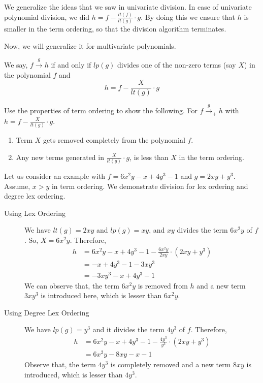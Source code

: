 We generalize the ideas that we saw in univariate division.  In case of
univariate polynomial division, we did $ h = f - \frac{lt(f)}{lt(g)}\cdot g$.
By doing this we ensure that $h$ is smaller in the term ordering, so that the
division algorithm terminates.

Now, we will generalize it for  multivariate polynomials.

\begin{definition}
We say, $f \stackrel{g}{\longrightarrow} h$ if and only if $lp(g)$ divides
one of the non-zero terms (say $X$) in the polynomial $f$ and 
$$ h = f - \frac{X}{lt(g)}\cdot g$$
\end{definition}

\begin{exercise} 
	Use the properties of term ordering to show the following. For  $f
	\stackrel{g}{\longrightarrow}_{+} h$ with $h = f -
	\frac{X}{lt(g)}\cdot g$.
	\begin{enumerate}
		\item Term $X$ gets removed completely from the polynomial $f$.
		\item Any new terms generated in $\frac{X}{lt(g)}\cdot g$, is
			less than $X$ in the term ordering.
	\end{enumerate}
\end{exercise}

Let us consider an example with $ f = 6x^2y - x + 4y^3 -1 $ and $ 
g = 2xy + y^3$. Assume, $x>y$ in term ordering.  We demonstrate division for
lex ordering and degree lex ordering.
\begin{description}
	\item[ Using Lex Ordering ] We have $lt(g) = 2xy$ and $lp(g) = xy$,
		and $xy$ divides the term $6x^2y$ of $f$. So, $X = 6x^2y$. 
		Therefore,
		\begin{align*}
		 h & = 6x^2y - x + 4y^3 -1 - \frac{6x^2y}{2xy}\cdot
		{(2xy + y^3)}\\
		&  = -x + 4y^3 -1 -3xy^3  \\
		& = -3xy^3 - x + 4y^3 - 1
		\end{align*}
		We can observe that, the term $6x^2y$ is removed from $h$ and
		a new term $3xy^3$ is introduced here, which is lesser than
		$6x^2y$.
	\item[Using Degree Lex Ordering] We  have $lp(g) = y^3$ and it divides
		the term $4y^3$ of $f$.  Therefore, 
		\begin{align*}
		 h & = 6x^2y - x + 4y^3 -1- \frac{4y^3}{y^3}\cdot {(2xy +
		 y^3)}\\
		 & = 6x^2y - 8xy -x-1
		\end{align*}
		Observe that, the term $4y^3$ is completely removed and a new
		term $8xy$ is introduced, which is lesser than $4y^3$.
\end{description}

